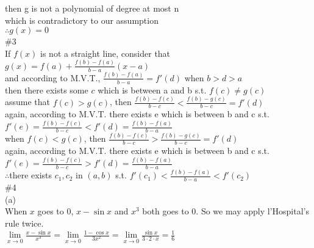\documentclass{article}
\begin{document}
then g is not a polynomial of degree at most n\\

which is contradictory to our assumption\\

$\therefore$\qquad $g(x)=0$\\

\textcolor[rgb]{0.00,0.00,0.50}{\#3}\\

If $f(x)$ is not a straight line, consider that $g(x)=f(a)+\displaystyle\frac{f(b)-f(a)}{b-a}(x-a)$\\

and according to M.V.T., $\displaystyle\frac{f(b)-f(a)}{b-a}=f'(d)$ when $b>d>a$\\

then there exists some $c$ which is between a and b s.t. $f(c)\neq g(c)$\\

assume that $f(c)>g(c)$, then $\displaystyle\frac{f(b)-f(c)}{b-c}<\frac{f(b)-g(c)}{b-c}=f'(d)$\\

again, according to M.V.T. there exists e which is between b and c s.t. $f'(e)=\displaystyle\frac{f(b)-f(c)}{b-c}<f'(d)=\frac{f(b)-f(a)}{b-a}$\\

when $f(c)<g(c)$, then $\displaystyle\frac{f(b)-f(c)}{b-c}>\frac{f(b)-g(c)}{b-c}=f'(d)$\\

again, according to M.V.T. there exists e which is between b and c s.t. $f'(e)=\displaystyle\frac{f(b)-f(c)}{b-c}>f'(d)=\frac{f(b)-f(a)}{b-a}$\\

$\therefore$\qquad there exists $c_1, c_2$ in $(a,b)$ s.t. $f'(c_1)<\displaystyle\frac{f(b)-f(a)}{b-a}<f'(c_2)$\\

\textcolor[rgb]{0.00,0.00,0.50}{\#4}\\

(a)\\

When $x$ goes to $0$, $x-\sin x$ and $x^3$ both goes to 0. So we may apply l'Hospital's rule twice.\\

$\lim \limits_{x \to 0}\displaystyle\frac{x-\sin x}{x^3}=\lim \limits_{x \to 0}\frac{1-\cos x}{3x^2}=\lim \limits_{x \to 0}\frac{\sin x}{3\cdot2\cdot x}=\frac{1}{6}$\\
\end{document}
